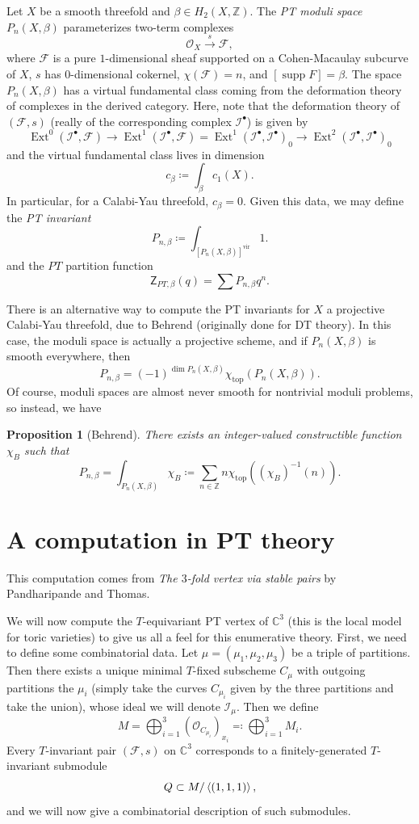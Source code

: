 \documentclass[leqno, openany]{memoir}
\newtheorem{prop}[thm]{Proposition}
\theoremstyle{definition}
\theoremstyle{remark}
\theoremstyle{plain}
\theoremstyle{definition}
\theoremstyle{remark}
\newcommand{\C}{\mathbb{C}}
\newcommand{\Z}{\mathbb{Z}}
\newcommand{\mc}[1]{\mathcal{#1}}
\newcommand{\mr}[1]{\mathrm{#1}}
\newcommand{\ms}[1]{\mathsf{#1}}
\newcommand{\1}{\mathbf{1}}
\newcommand{\2}{\mathbf{2}}
\newcommand{\3}{\mathbf{3}}
\DeclareMathOperator{\supp}{supp}
\DeclareMathOperator{\Ext}{Ext}
\begin{document}
Let $X$ be a smooth threefold and $\beta \in H_2(X, \Z)$. The \textit{PT moduli space} $P_n(X, \beta)$ parameterizes two-term complexes
\[ \mc{O}_X \xrightarrow{s} \mc{F}, \]
where $\mc{F}$ is a pure $1$-dimensional sheaf supported on a Cohen-Macaulay subcurve of $X$, $s$ has $0$-dimensional cokernel, $\chi(\mc{F}) = n$, and $[\supp F] = \beta$. The space $P_n(X, \beta)$ has a virtual fundamental class coming from the deformation theory of complexes in the derived category. Here, note that the deformation theory of $(\mc{F}, s)$ (really of the corresponding complex $\mc{I}^{\bullet}$) is given by
\[ \Ext^0(\mc{I}^{\bullet}, \mc{F}) \to \Ext^1(\mc{I}^{\bullet}, \mc{F}) = {\Ext^1(\mc{I}^{\bullet}, \mc{I}^{\bullet})}_0 \to {\Ext^2(\mc{I}^{\bullet}, \mc{I}^{\bullet})}_0 \]
and the virtual fundamental class lives in dimension
\[ c_{\beta} \coloneqq \int_{\beta} c_1(X). \]
In particular, for a Calabi-Yau threefold, $c_{\beta} = 0$. Given this data, we may define the \textit{PT invariant}
\[ P_{n, \beta} \coloneqq \int_{{[P_n(X, \beta)]}^{\mr{vir}}} 1. \]
and the $PT$ partition function
\[ \ms{Z}_{PT, \beta}(q) = \sum P_{n, \beta} q^n. \]

There is an alternative way to compute the PT invariants for $X$ a projective Calabi-Yau threefold, due to Behrend (originally done for DT theory). In this case, the moduli space is actually a projective scheme, and if $P_n(X, \beta)$ is smooth everywhere, then
\[ P_{n, \beta} = {(-1)}^{\dim P_n(X, \beta)} \chi_{\mr{top}}(P_n(X, \beta)). \]
Of course, moduli spaces are almost never smooth for nontrivial moduli problems, so instead, we have
\begin{prop}[Behrend]
    There exists an integer-valued constructible function $\chi_B$ such that
    \[ P_{n, \beta} = \int_{P_n(X, \beta)} \chi_B \coloneqq \sum_{n \in \Z} n \chi_{\mr{top}}({(\chi_B)}^{-1}(n)). \]
\end{prop}

\section{A computation in PT theory}%
\label{sec:a_computation_in_pt_theory}

This computation comes from \textit{The $3$-fold vertex via stable pairs} by Pandharipande and Thomas.

We will now compute the $T$-equivariant PT vertex of $\C^3$ (this is the local model for toric varieties) to give us all a feel for this enumerative theory. First, we need to define some combinatorial data. Let $\mu = (\mu_1, \mu_2, \mu_3)$ be a triple of partitions. Then there exists a unique minimal $T$-fixed subscheme $C_{\mu}$ with outgoing partitions the $\mu_i$ (simply take the curves $C_{\mu_i}$ given by the three partitions and take the union), whose ideal we will denote $\mc{I}_{\mu}$. Then we define
\[ M = \bigoplus_{i=1}^3 {(\mc{O}_{C_{\mu_i}})}_{x_i} \eqqcolon \bigoplus_{i=1}^3 M_i. \]
Every $T$-invariant pair $(\mc{F}, s)$ on $\C^3$ corresponds to a finitely-generated $T$-invariant submodule
\[ Q \subset M/\ev{(1,1,1)}, \]
and we will now give a combinatorial description of such submodules.
\end{document}
